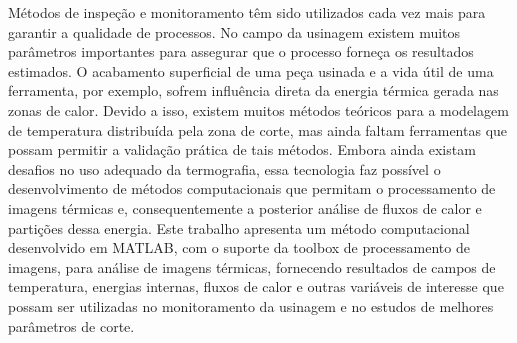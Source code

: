 	M{\'e}todos de inspe\c{c}{\~a}o e monitoramento t{\^e}m sido utilizados cada vez mais para garantir a qualidade de processos. No campo da usinagem existem muitos par\^ametros importantes para assegurar que o processo forne\c{c}a os resultados estimados. O acabamento superficial de uma pe\c{c}a usinada e a vida \'util de uma ferramenta, por exemplo, sofrem influ\^encia direta da energia t\'ermica gerada nas zonas de calor. Devido a isso, existem muitos m\'etodos te\'oricos para a modelagem de temperatura distribu\'ida pela zona de corte, mas ainda faltam ferramentas que possam permitir a valida\c{c}{\~a}o pr\'atica de tais m\'etodos. Embora ainda existam desafios no uso adequado da termografia, essa tecnologia faz poss\'ivel o desenvolvimento de m\'etodos computacionais que permitam o processamento de imagens t\'ermicas e, consequentemente a posterior an\'alise de fluxos de calor e parti\c{c}{\~o}es dessa energia.
	Este trabalho apresenta um m\'etodo computacional desenvolvido em MATLAB, com o suporte da toolbox de processamento de imagens, para an\'alise de imagens t\'ermicas, fornecendo resultados de campos de temperatura, energias internas, fluxos de calor e outras vari\'aveis de interesse que possam ser utilizadas no monitoramento da usinagem e no estudos de melhores par\^ametros de corte.